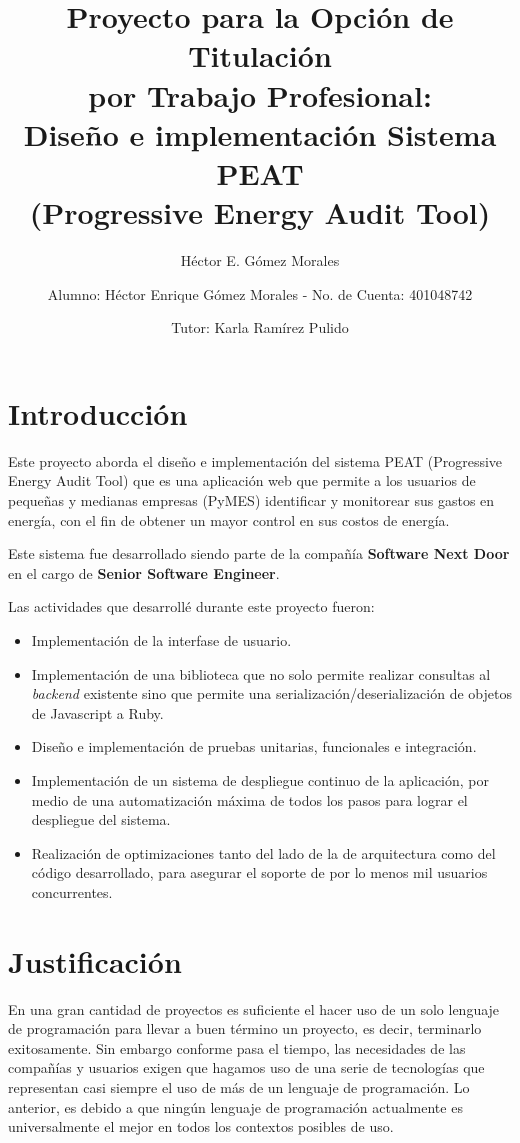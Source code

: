 \documentclass{article}
\author{Héctor E. Gómez Morales}
\title{Proyecto para la Opción de Titulación\\
  por Trabajo Profesional:\\
  Diseño e implementación Sistema PEAT\\
  (Progressive Energy Audit Tool)}
\begin{document}
\author{ Alumno: Héctor Enrique Gómez Morales - No. de Cuenta: 401048742 \and
  Tutor: Karla Ramírez Pulido}
\maketitle
\section{Introducción}
Este proyecto aborda el diseño e implementación del sistema
PEAT (Progressive Energy Audit Tool) que es una aplicación web que
permite a los usuarios de pequeñas y medianas empresas (PyMES)
identificar y monitorear sus gastos en energía, con el fin de obtener
un mayor control en sus costos de energía.

Este sistema fue desarrollado siendo parte de la compañía
\textbf{Software Next Door} en el cargo de \textbf{Senior Software Engineer}.

Las actividades que desarrollé durante este proyecto fueron:
\begin{itemize}
\item Implementación de la interfase de usuario.
\item Implementación de una biblioteca que no solo permite realizar consultas
  al \textit{backend} existente sino que permite una serialización/deserialización
  de objetos de Javascript a Ruby.
\item Diseño e implementación de pruebas unitarias, funcionales e integración.
\item Implementación de un sistema de despliegue continuo de la aplicación, por
  medio de una automatización máxima de todos los pasos para lograr el despliegue
  del sistema.
\item Realización de optimizaciones tanto del lado de la de arquitectura como
  del código desarrollado, para asegurar el soporte de por lo menos mil usuarios concurrentes.
\end{itemize}

\section{Justificación}
En una gran cantidad de proyectos es suficiente
el hacer uso de un solo lenguaje de programación para llevar a buen
término un proyecto, es decir, terminarlo exitosamente.
Sin embargo conforme pasa el tiempo, las necesidades
de las compañías y usuarios exigen que hagamos uso de una serie de
tecnologías que representan casi siempre el uso de más de un lenguaje
de programación. Lo anterior, es debido a que ningún lenguaje de programación
actualmente es universalmente el mejor en todos los contextos posibles de uso.
\end{document}
